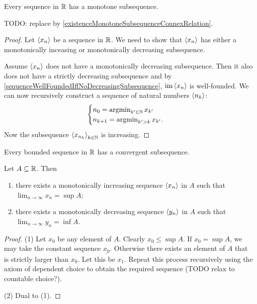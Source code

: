 \begin{proposition} \label{monotoneSubsequenceRealSequence}
Every sequence in $\mathbb{R}$ has a monotone subsequence.
\end{proposition}
TODO: replace by \ref{existenceMonotoneSubsequenceConnexRelation}.
\begin{proof}
Let $\left\langle x_n \right\rangle$ be a sequence in $\mathbb{R}$. We need to show that $\left\langle x_n \right\rangle$ has either a monotonically inceasing or monotonically decreasing subsequence.

Assume $\left\langle x_n \right\rangle$ does not have a monotonically decreasing subsequence. Then it also does not have a strictly decreasing subsequence and by \ref{sequenceWellFoundedIffNoDecreasingSubsequence}, $\operatorname{im}\left\langle x_n \right\rangle$ is well-founded. We can now recursively construct a sequence of natural numbers $\left\langle n_k \right\rangle$:
\[ \begin{cases}
n_0 = \operatorname{argmin}_{k'\in \mathbb{N}}x_{k'} \\
n_{k+1} = \operatorname{argmin}_{k'> k}x_{k'}.
\end{cases} \]
Now the subsequence $\left\langle x_{n_k} \right\rangle_{k\in \mathbb{N}}$ is increasing.
\end{proof}
\begin{corollary}
Every bounded sequence in $\mathbb{R}$ has a convergent subsequence. 
\end{corollary}


\begin{proposition} \label{sequencesToExtrema}
Let $A\subseteq \mathbb{R}$. Then
\begin{enumerate}
\item there exists a monotonically increasing sequence $\left\langle x_n \right\rangle$ in $A$ such that $\lim_{n\to\infty}x_n = \sup A$;
\item there exists a monotonically decreasing sequence $\left\langle y_n \right\rangle$ in $A$ such that $\lim_{n\to\infty}y_n = \inf A$.
\end{enumerate}
\end{proposition}
\begin{proof}
(1) Let $x_0$ be any element of $A$. Clearly $x_0\leq \sup A$. If $x_0 = \sup A$, we may take the constant sequence $\underline{x_0}$. Otherwise there exists an element of $A$ that is strictly larger than $x_0$. Let this be $x_1$. Repeat this process recursively using the axiom of dependent choice to obtain the required sequence (TODO relax to countable choice?).

(2) Dual to (1).
\end{proof}

